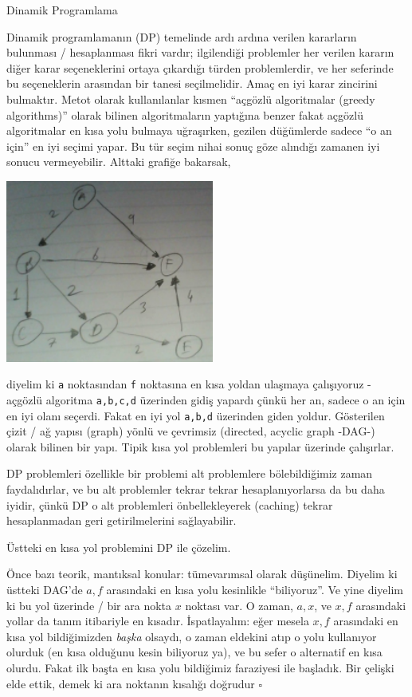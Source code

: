 \documentclass[12pt,fleqn]{article}\usepackage{../../common}
\begin{document}
Dinamik Programlama

Dinamik programlamanın (DP) temelinde ardı ardına verilen kararların
bulunması / hesaplanması fikri vardır; ilgilendiği problemler her verilen
kararın diğer karar seçeneklerini ortaya çıkardığı türden problemlerdir, ve
her seferinde bu seçeneklerin arasından bir tanesi seçilmelidir. Amaç en
iyi karar zincirini bulmaktır. Metot olarak kullanılanlar kısmen ``açgözlü
algoritmalar (greedy algorithms)'' olarak bilinen algoritmaların yaptığına
benzer fakat açgözlü algoritmalar en kısa yolu bulmaya uğraşırken, gezilen
düğümlerde sadece ``o an için'' en iyi seçimi yapar. Bu tür seçim nihai
sonuç göze alındığı zamanen iyi sonucu vermeyebilir. Alttaki grafiğe
bakarsak,

\includegraphics[height=6cm]{dp1.png}

diyelim ki \verb!a! noktasından \verb!f! noktasına en kısa yoldan ulaşmaya
çalışıyoruz - açgözlü algoritma \verb!a,b,c,d! üzerinden gidiş yapardı
çünkü her an, sadece o an için en iyi olanı seçerdi. Fakat en iyi yol
\verb!a,b,d! üzerinden giden yoldur. Gösterilen çizit / ağ yapısı (graph)
yönlü ve çevrimsiz (directed, acyclic graph -DAG-) olarak bilinen bir
yapı. Tipik kısa yol problemleri bu yapılar üzerinde çalışırlar.

DP problemleri özellikle bir problemi alt problemlere bölebildiğimiz zaman
faydalıdırlar, ve bu alt problemler tekrar tekrar hesaplanıyorlarsa da bu
daha iyidir, çünkü DP o alt problemleri önbellekleyerek (caching) tekrar
hesaplanmadan geri getirilmelerini sağlayabilir. 

Üstteki en kısa yol problemini DP ile çözelim.

Önce bazı teorik, mantıksal konular: tümevarımsal olarak düşünelim. Diyelim
ki üstteki DAG'de $a,f$ arasındaki en kısa yolu kesinlikle
``biliyoruz''. Ve yine diyelim ki bu yol üzerinde / bir ara nokta $x$
noktası var. O zaman, $a,x$, ve $x,f$ arasındaki yollar da tanım itibariyle
en kısadır. İspatlayalım: eğer mesela $x,f$ arasındaki en kısa yol
bildiğimizden {\em başka} olsaydı, o zaman eldekini atıp o yolu kullanıyor
olurduk (en kısa olduğunu kesin biliyoruz ya), ve bu sefer o alternatif en
kısa olurdu. Fakat ilk başta en kısa yolu bildiğimiz faraziyesi ile
başladık. Bir çelişki elde ettik, demek ki ara noktanın kısalığı doğrudur
$\square$
\end{document}
